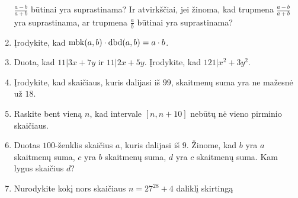 \begin{enumerate}
    $\frac{a-b}{a+b}$ būtinai yra suprastinama? Ir atvirkščiai, jei žinoma, kad
    trupmena $\frac{a-b}{a+b}$ yra suprastinama, ar trupmena $\frac{a}{b}$
    būtinai yra suprastinama?  
  \item Įrodykite, kad $\operatorname{mbk}(a,b)\cdot \operatorname{dbd}(a,b)=a\cdot b$.  
  \item Duota, kad $11|3x+7y$ ir $11|2x+5y$.  Įrodykite, kad
    $121|x^2+3y^2$.  
  \item Įrodykite, kad skaičiaus, kuris dalijasi iš $99$, skaitmenų suma
    yra ne mažesnė už $18$.  
  \item Raskite bent vieną $n$, kad intervale $[n,n+10]$ nebūtų nė vieno
    pirminio skaičiaus.  
 \item Duotas $100$-ženklis skaičius $a$, kuris dalijasi iš $9$.  Žinome,
    kad $b$ yra $a$ skaitmenų suma, $c$ yra $b$ skaitmenų suma, $d$ yra $c$
    skaitmenų suma. Kam lygus skaičius $d$?
  \item Nurodykite kokį nors skaičiaus $n = 27^{28} + 4$ daliklį skirtingą

\end{enumerate}
